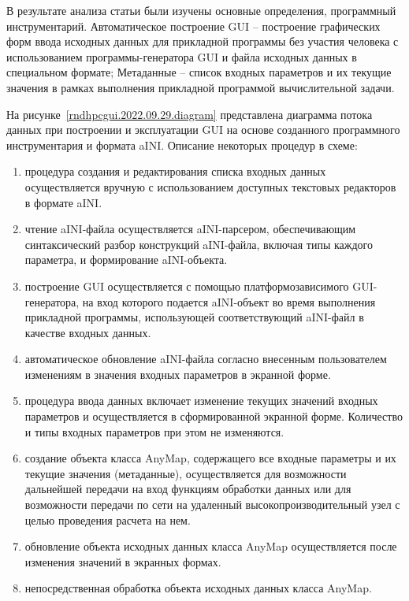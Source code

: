 \def\notedate{2022.09.29}
\def\currentauthor{Василян А.Р. (РК6-73Б)}


В результате анализа статьи \cite{Sokolov2017} были изучены основные определения, программный инструментарий. Автоматическое построение GUI -- построение графических форм ввода исходных данных для прикладной программы без участия человека с использованием программы-генератора GUI и файла исходных данных в специальном формате; Метаданные -- список входных параметров и их текущие значения в рамках выполнения прикладной программой вычислительной задачи.

На рисунке~\ref{rndhpcgui.2022.09.29.diagram} представлена диаграмма потока данных при построении и эксплуатации GUI на основе созданного программного инструментария и формата aINI. Описание некоторых процедур в схеме:
\begin{enumerate} [start=0]
	\item процедура создания и редактирования списка входных данных осуществляется вручную с использованием доступных текстовых редакторов в формате aINI.
	\item чтение aINI-файла осуществляется aINI-парсером, обеспечивающим синтаксический разбор конструкций aINI-файла, включая типы каждого параметра, и формирование aINI-объекта.
	\item построение GUI осуществляется с помощью платформозависимого GUI-генератора, на вход которого подается aINI-объект во время выполнения прикладной программы, использующей соответствующий aINI-файл в качестве входных данных.
	\item автоматическое обновление aINI-файла согласно внесенным пользователем изменениям в значения входных параметров в экранной форме. 
	\item процедура ввода данных включает изменение текущих значений входных параметров и осуществляется в сформированной экранной форме. Количество и типы входных параметров при этом не изменяются.
	\item создание объекта класса AnyMap, содержащего все входные параметры и их текущие значения (метаданные), осуществляется для возможности дальнейшей передачи на вход функциям обработки данных или для возможности передачи по сети на удаленный высокопроизводительный узел с целью проведения расчета на нем.
	\item обновление объекта исходных данных класса AnyMap осуществляется после изменения значений в экранных формах.
	\item непосредственная обработка объекта исходных данных класса AnyMap.
\end{enumerate}

